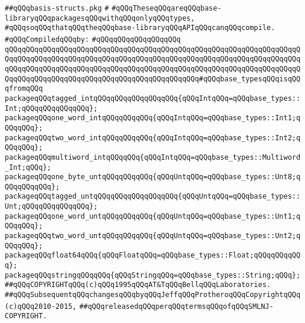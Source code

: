\label{src/lib/std/types-only/basis-structs.pkg}
\verb|##qQQqbasis-structs.pkg|\newline
\verb|#|\newline
\verb|#qQQqTheseqQQqareqQQqbase-libraryqQQqpackagesqQQqwithqQQqonlyqQQqtypes,|\newline
\verb|#qQQqsoqQQqthatqQQqtheqQQqbase-libraryqQQqAPIqQQqcanqQQqcompile.|\newline
\newline
\verb|#qQQqCompiledqQQqby:|\newline
\verb|#qQQqqQQqqQQqqQQqqQQq|\newline
\newline
\newline
\verb|qQQqqQQqqQQqqQQqqQQqqQQqqQQqqQQqqQQqqQQqqQQqqQQqqQQqqQQqqQQqqQQqqQQqqQQqqQQqqQQqqQQqqQQqqQQqqQQqqQQqqQQqqQQqqQQqqQQqqQQqqQQqqQQqqQQqqQQqqQQqqQQqqQQqqQQqqQQqqQQqqQQqqQQqqQQqqQQqqQQqqQQqqQQqqQQqqQQqqQQqqQQqqQQqqQQqqQQqqQQqqQQqqQQqqQQqqQQqqQQqqQQqqQQqqQQqqQQq#qQQqbase_typesqQQqisqQQqfromqQQq|\newline
\newline
\verb|packageqQQqtagged_intqQQqqQQqqQQqqQQqqQQq{qQQqIntqQQq=qQQqbase_types::Int;qQQqqQQqqQQqqQQq};|\newline
\verb|packageqQQqone_word_intqQQqqQQqqQQq{qQQqIntqQQq=qQQqbase_types::Int1;qQQqqQQq};|\newline
\verb|packageqQQqtwo_word_intqQQqqQQqqQQq{qQQqIntqQQq=qQQqbase_types::Int2;qQQqqQQq};|\newline
\verb|packageqQQqmultiword_intqQQqqQQq{qQQqIntqQQq=qQQqbase_types::Multiword_Int;qQQq};|\newline
\newline
\verb|packageqQQqone_byte_untqQQqqQQqqQQq{qQQqUntqQQq=qQQqbase_types::Unt8;qQQqqQQqqQQq};|\newline
\verb|packageqQQqtagged_untqQQqqQQqqQQqqQQqqQQq{qQQqUntqQQq=qQQqbase_types::Unt;qQQqqQQqqQQqqQQq};|\newline
\verb|packageqQQqone_word_untqQQqqQQqqQQq{qQQqUntqQQq=qQQqbase_types::Unt1;qQQqqQQq};|\newline
\verb|packageqQQqtwo_word_untqQQqqQQqqQQq{qQQqUntqQQq=qQQqbase_types::Unt2;qQQqqQQq};|\newline
\newline
\newline
\verb|packageqQQqfloat64qQQq{qQQqFloatqQQq=qQQqbase_types::Float;qQQqqQQqqQQq};|\newline
\verb|packageqQQqstringqQQqqQQq{qQQqStringqQQq=qQQqbase_types::String;qQQq};|\newline
\newline
\newline
\verb|##qQQqCOPYRIGHTqQQq(c)qQQq1995qQQqAT&TqQQqBellqQQqLaboratories.|\newline
\verb|##qQQqSubsequentqQQqchangesqQQqbyqQQqJeffqQQqProtheroqQQqCopyrightqQQq(c)qQQq2010-2015,|\newline
\verb|##qQQqreleasedqQQqperqQQqtermsqQQqofqQQqSMLNJ-COPYRIGHT.|\newline


